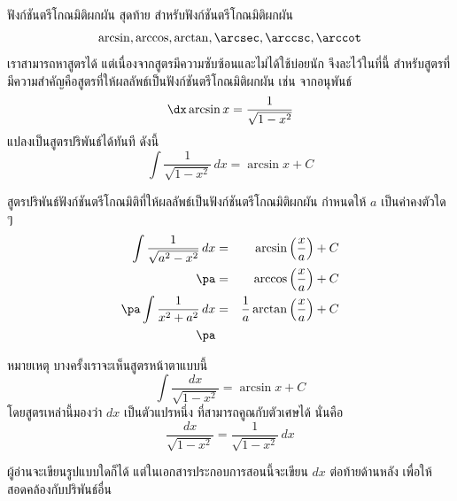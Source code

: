 \begin{frame}{ฟังก์ชันตรีโกณมิติผกผัน}
สุดท้าย สำหรับฟังก์ชันตรีโกณมิติผกผัน
\[\arcsin, \arccos, \arctan, \arcsec, \arccsc, \arccot\]
เราสามารถหาสูตรได้ แต่เนื่องจากสูตรมีความซับซ้อนและไม่ได้ใช้บ่อยนัก จึงละไว้ในที่นี้ สำหรับสูตรที่มีความสำคัญคือสูตรที่ให้ผลลัพธ์เป็นฟังก์ชันตรีโกณมิติผกผัน เช่น จากอนุพันธ์
\[ \dx \arcsin x = \frac{1}{\sqrt{1-x^2}} \]
แปลงเป็นสูตรปริพันธ์ได้ทันที ดังนี้
\[ \int \frac{1}{\sqrt{1-x^2}} \, dx = \arcsin x + C\]
\end{frame}

\begin{frame}
\begin{thm}{สูตรปริพันธ์ฟังก์ชันตรีโกณมิติที่ให้ผลลัพธ์เป็นฟังก์ชันตรีโกณมิติผกผัน}{}
กำหนดให้ $a$ เป็นค่าคงตัวใด ๆ
\begin{eqnarray*}
\int \frac{1}{\sqrt{a^2-x^2}} \, dx &=& \arcsin\left(\frac{x}{a}\right) + C \\ \pa
&=& \arccos\left(\frac{x}{a}\right) + C \\ \pa
\int \frac{1}{x^2+a^2} \, dx &=& \frac{1}{a}\arctan\left(\frac{x}{a}\right) + C \\ \pa
\end{eqnarray*}
\end{thm}
\end{frame}

\begin{frame}{}
\begin{remark}{หมายเหตุ}
บางครั้งเราจะเห็นสูตรหน้าตาแบบนี้
\[ \int \frac{dx}{\sqrt{1-x^2}} = \arcsin x + C\]
โดยสูตรเหล่านี้มองว่า $dx$ เป็นตัวแปรหนึ่ง ที่สามารถคูณกับตัวเศษได้ นั่นคือ
\[ \frac{dx}{\sqrt{1-x^2}} = \frac{1}{\sqrt{1-x^2}} \, dx\]

ผู้อ่านจะเขียนรูปแบบใดก็ได้ แต่ในเอกสารประกอบการสอนนี้จะเขียน $dx$ ต่อท้ายด้านหลัง เพื่อให้สอดคล้องกับปริพันธ์อื่น
\end{remark}
\end{frame}